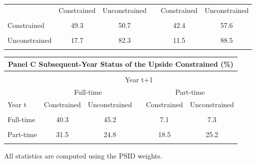\begin{center}
\begin{threeparttable}
\begin{tabular}{lccccc}
                          & Constrained &  Unconstrained && Constrained & Unconstrained \\ \\
Constrained               &  49.3       &  50.7          && 42.4        & 57.6          \\ \\
Unconstrained             &  17.7       &  82.3          && 11.5        & 88.5          \\ \\
\hline
\end{tabular}

\begin{tabular}{lccccc}
\multicolumn{6}{c}{Panel C Subsequent-Year Status of the Upside Constrained (\%)} \\
\hline \\[-1ex]
                          & \multicolumn{5}{c}{Year t+1}\\
\cline{2-6}

                          & \multicolumn{2}{c}{Full-time} && \multicolumn{2}{c}{Part-time}  \\
Year t                    & Constrained &  Unconstrained  && Constrained & Unconstrained \\ \\
Full-time                 & 40.3        &  45.2           && 7.1         & 7.3          \\ \\
Part-time                 & 31.5        &  24.8           && 18.5        & 25.2          \\ \\
\hline
\end{tabular}
\begin{tablenotes}
\item[] \footnotesize{All statistics are computed using the PSID weights.}
\end{tablenotes}
\label{sum}
\end{threeparttable}
\end{center}













